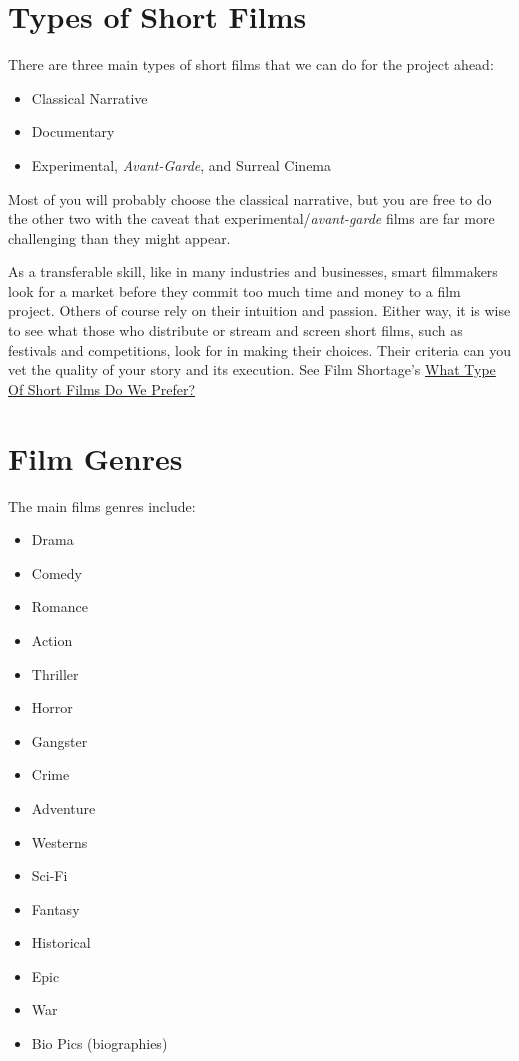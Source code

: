 \documentclass[
  letterpaper,
  DIV=11,
  numbers=noendperiod]{scrreprt}
\providecommand{\tightlist}{%
  \setlength{\itemsep}{0pt}\setlength{\parskip}{0pt}}\usepackage{longtable,booktabs,array}
\begin{document}
\section{Types of Short Films}\label{types-of-short-films}

There are three main types of short films that we can do for the project
ahead:

\begin{itemize}
\tightlist
\item
  Classical Narrative
\item
  Documentary
\item
  Experimental, \emph{Avant-Garde}, and Surreal Cinema
\end{itemize}

Most of you will probably choose the classical narrative, but you are
free to do the other two with the caveat that
experimental/\emph{avant-garde} films are far more challenging than they
might appear.

As a transferable skill, like in many industries and businesses, smart
filmmakers look for a market before they commit too much time and money
to a film project. Others of course rely on their intuition and passion.
Either way, it is wise to see what those who distribute or stream and
screen short films, such as festivals and competitions, look for in
making their choices. Their criteria can you vet the quality of your
story and its execution. See Film Shortage's
\href{https://filmshortage.com/what-we-like/}{What Type Of Short Films
Do We Prefer?}

\section{Film Genres}\label{film-genres}

The main films genres include:

\begin{itemize}
\tightlist
\item
  Drama
\item
  Comedy
\item
  Romance
\item
  Action
\item
  Thriller
\item
  Horror
\item
  Gangster
\item
  Crime
\item
  Adventure
\item
  Westerns
\item
  Sci-Fi
\item
  Fantasy
\item
  Historical
\item
  Epic
\item
  War
\item
  Bio Pics (biographies)
\end{itemize}
\end{document}
